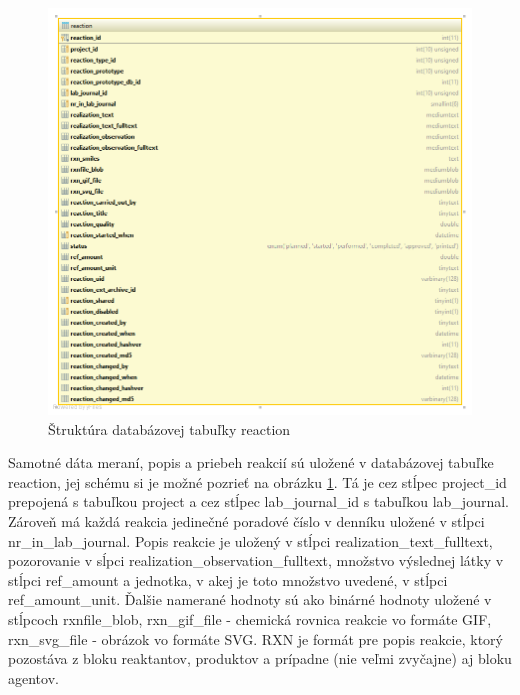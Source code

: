 \documentclass[thesis=M,slovak]{FITthesis}[2013/05/06]
\begin{document}
\begin{figure}\centering
	\includegraphics[width=1.0\textwidth]{Schema_DB_Open_Enventory/reaction.png}
 	\caption[Štruktúra databázovej tabuľky reaction]{Štruktúra databázovej tabuľky reaction}\label{graphics:reaction}
\end{figure}

Samotné dáta meraní, popis a priebeh reakcií sú uložené v databázovej tabuľke reaction, jej schému si je možné pozrieť na obrázku \ref{graphics:reaction}. Tá je cez stĺpec project\_id prepojená s tabuľkou project a cez stĺpec lab\_journal\_id s tabuľkou lab\_journal. Zároveň má každá reakcia jedinečné poradové číslo v denníku uložené v stĺpci nr\_in\_lab\_journal.
Popis reakcie je uložený v stĺpci realization\_text\_fulltext, pozorovanie v sĺpci realization\_observation\_fulltext, množstvo výslednej látky v stĺpci ref\_amount a jednotka, v akej je toto množstvo uvedené, v stĺpci ref\_amount\_unit. Ďalšie namerané hodnoty sú ako binárné hodnoty uložené v stĺpcoch rxnfile\_blob, rxn\_gif\_file - chemická rovnica reakcie vo formáte GIF, rxn\_svg\_file - obrázok vo formáte SVG. RXN je formát pre popis reakcie, ktorý pozostáva z bloku reaktantov, produktov a prípadne (nie veľmi zvyčajne) aj bloku agentov.
\end{document}

